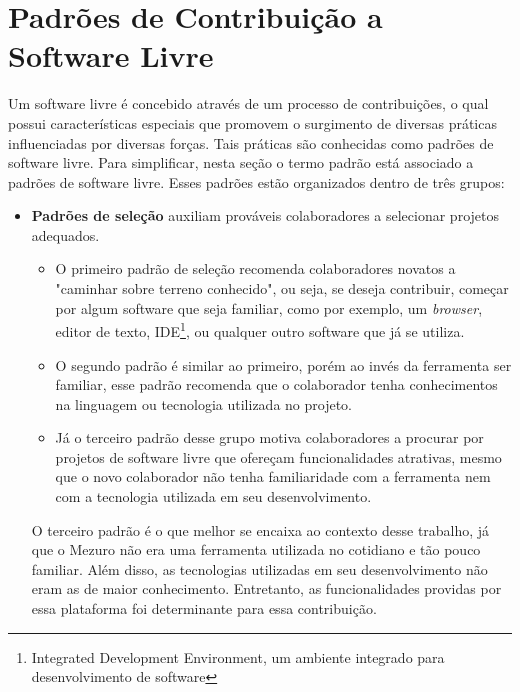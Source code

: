 \section{Padrões de Contribuição a Software Livre}
\label{sec-padroes-sl} 

Um software livre é concebido através de um processo de contribuições, o qual possui características especiais que promovem o surgimento de diversas práticas influenciadas por diversas forças. Tais práticas são conhecidas como padrões de software livre. Para simplificar, nesta seção o termo padrão está associado a padrões de software livre. Esses padrões estão organizados dentro de três grupos:

\begin{itemize}

	\item \textbf{Padrões de seleção} auxiliam prováveis colaboradores a selecionar projetos adequados.

		\begin{itemize}

			\item O primeiro padrão de seleção recomenda colaboradores novatos a "caminhar sobre terreno conhecido", ou seja, se deseja contribuir, começar por algum software que seja familiar, como por exemplo, um \textit{browser}, editor de texto, IDE\footnote{Integrated Development Environment, um ambiente integrado para desenvolvimento de software}, ou qualquer outro software que já se utiliza.

			\item O segundo padrão é similar ao primeiro, porém ao invés da ferramenta ser familiar, esse padrão recomenda que o colaborador tenha conhecimentos na linguagem ou tecnologia utilizada no projeto.

			\item Já o terceiro padrão desse grupo motiva colaboradores a procurar por projetos de software livre que ofereçam funcionalidades atrativas, mesmo que o novo colaborador não tenha familiaridade com a ferramenta nem com a tecnologia utilizada em seu desenvolvimento.
		\end{itemize}

O terceiro padrão é o que melhor se encaixa ao contexto desse trabalho, já que o Mezuro não era uma ferramenta utilizada no cotidiano e tão pouco familiar. Além disso, as tecnologias utilizadas em seu desenvolvimento não eram as de maior conhecimento. Entretanto, as funcionalidades providas por essa plataforma foi determinante para essa contribuição.


\end{itemize}
